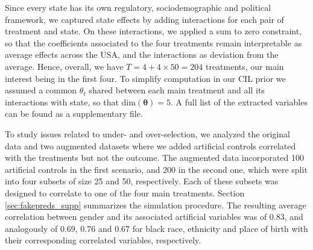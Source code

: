 \documentclass[12pt]{article}
\newcommand{\btheta}{{\bm{\theta}}}
\newcommand{\omcom}[1]{ {\color{blue} #1} }
\newcommand{\davidcom}[1]{{\color{red} [DR. #1]} }
\begin{document}
Since every state has its own regulatory, sociodemographic and political framework, we captured state effects by adding interactions for each pair of treatment and state. On these interactions, we applied a sum to zero constraint, so that the coefficients associated to the four treatments remain interpretable as average effects across the USA, and the interactions as deviation from the average. Hence, overall, we have $T = 4+4 \times 50 = 204$ treatments, our main interest being in the first four. 
To simplify computation in our CIL prior we assumed a common $\theta_t$
shared between each main treatment and all its interactions with state, so that $\mbox{dim}(\btheta)=5$. %
A full list of the extracted variables can be found as a supplementary file.%

To study issues related to under- and over-selection, we analyzed the original data and two augmented datasets where we added artificial controls correlated with the treatments but not the outcome. The augmented data incorporated 100 artificial controls in the first scenario, and 200 in the second one, which were split into four subsets of size 25 and 50, respectively. Each of these subsets was designed to correlate to one of the four main treatments. Section \ref{sec:fakepreds_supp} summarizes the simulation procedure.
The resulting average correlation between gender and its associated artificial variables was of $0.83$, and analogously of $0.69$, $0.76$ and $0.67$ for black race, ethnicity and place of birth with their corresponding correlated variables, respectively. %
\end{document}
